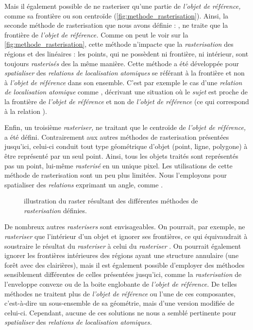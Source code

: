 Mais il également possible de ne rasteriser qu'une partie de
\emph{l'objet de référence,} comme sa frontière ou son centroïde
(\autoref{fig:methode_rasterisation}). Ainsi, la seconde méthode de
rasterisation que nous avons définie : , ne traite que
la frontière de \emph{l'objet de référence.} Comme on peut le voir sur
la \autoref{fig:methode_rasterisation}, cette méthode n'impacte que la
\emph{rasterisation} des régions et des linéaires : les points, qui ne
possèdent ni frontière, ni intérieur, sont toujours \emph{rasterisés}
des la même manière. Cette méthode a été développée pour
\emph{spatialiser} des \emph{relations de localisation atomiques} se
référant à la frontière et non à \emph{l'objet de référence} dans son
ensemble. C'est par exemple le cas d'une \emph{relation de
  localisation atomique} comme ,
décrivant une situation où le \emph{sujet} est proche de la frontière
de \emph{l'objet de référence} et non de \emph{l'objet de référence}
(ce qui correspond à la relation ).

Enfin, un troisième \emph{rasteriser,} ne traitant que le centroïde de
\emph{l'objet de référence,} a été défini. Contrairement aux autres
méthodes de rasterisation présentées jusqu'ici, celui-ci conduit tout
type géométrique d'objet (point, ligne, polygone) à être représenté
par un seul point. Ainsi, tous les objets traités sont représentés pas
un point, lui-même \emph{rasterisé} en un unique pixel. Les
utilisations de cette méthode de rasterisation sont un peu plus
limitées. Nous l'employons pour spatialiser des \emph{relations}
exprimant un angle, comme .

\begin{figure}
  \centering
  
  \caption{illustration du raster résultant des différentes méthodes
    de \emph{rasterisation} définies.}
  \label{fig:methode_rasterisation}
\end{figure}

De nombreux autres \emph{rasterisers} sont envisageables. On pourrait,
par exemple, ne \emph{rasteriser} que l'intérieur d'un objet et
ignorer ses frontières, ce qui équivaudrait à soustraire le résultat
du \emph{rasteriser}  à celui du \emph{rasteriser}
. On pourrait également ignorer les frontières
intérieures des régions ayant une structure annulaire (\eg une forêt
avec des clairières), mais il est également possible d'employer des
méthodes sensiblement différentes de celles présentées jusqu'ici,
comme la \emph{rasterisation} de l'enveloppe convexe ou de la boite
englobante de \emph{l'objet de référence.} De telles méthodes ne
traitent plus de \emph{l'objet de référence} ou l'une de ces
composantes, c'est-à-dire un sous-ensemble de sa géométrie, mais d'une
version modifiée de celui-ci. Cependant, aucune de ces solutions ne
nous a semblé pertinente pour \emph{spatialiser} des \emph{relations
  de localisation atomiques.}

